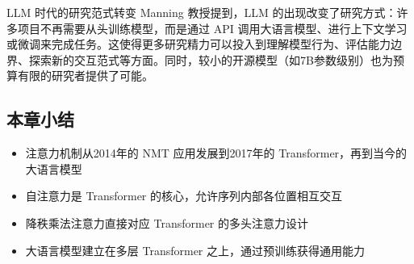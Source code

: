 \begin{knowledgebox}{LLM 时代的研究范式转变}
Manning 教授提到，LLM 的出现改变了研究方式：许多项目不再需要从头训练模型，而是通过 API 调用大语言模型、进行上下文学习或微调来完成任务。这使得更多研究精力可以投入到理解模型行为、评估能力边界、探索新的交互范式等方面。同时，较小的开源模型（如7B参数级别）也为预算有限的研究者提供了可能。
\end{knowledgebox}

\subsection{本章小结}

\begin{itemize}
    \item 注意力机制从2014年的 NMT 应用发展到2017年的 Transformer，再到当今的大语言模型
    \item 自注意力是 Transformer 的核心，允许序列内部各位置相互交互
    \item 降秩乘法注意力直接对应 Transformer 的多头注意力设计
    \item 大语言模型建立在多层 Transformer 之上，通过预训练获得通用能力
\end{itemize}


